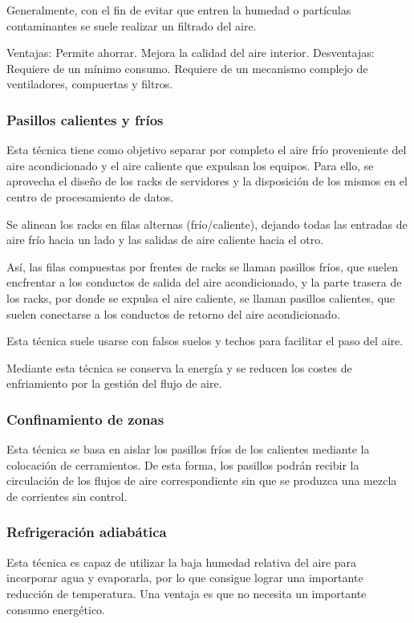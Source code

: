 Generalmente, con el fin de evitar que entren la humedad o partículas contaminantes se suele realizar un filtrado del aire.

Ventajas:
Permite ahorrar.
Mejora la calidad del aire interior.
Desventajas:
Requiere de un mínimo consumo.
Requiere de un mecanismo complejo de ventiladores, compuertas y filtros.

\subsubsection*{Pasillos calientes y fríos}

Esta técnica tiene como objetivo separar por completo el aire frío proveniente del aire acondicionado y el aire caliente que expulsan los equipos. Para ello, se aprovecha el diseño de los racks de servidores y la disposición de los mismos en el centro de procesamiento de datos.

Se alinean los racks en filas alternas (frío/caliente), dejando todas las entradas de aire frío hacia un lado y las salidas de aire caliente hacia el otro.

Así, las filas compuestas por frentes de racks se llaman pasillos fríos, que suelen encfrentar a los conductos de salida del aire acondicionado, y la parte trasera de los racks, por donde se expulsa el aire caliente, se llaman pasillos calientes, que suelen conectarse a los conductos de retorno del aire acondicionado.

Esta técnica suele usarse con falsos suelos y techos para facilitar el paso del aire.

Mediante esta técnica se conserva la energía y se reducen los costes de enfriamiento por la gestión del flujo de aire.


\subsubsection*{Confinamiento de zonas}

Esta técnica se basa en aislar los pasillos fríos de los calientes mediante la colocación de cerramientos. De esta forma, los pasillos podrán recibir la circulación de los flujos de aire correspondiente sin que se produzca una mezcla de corrientes sin control.

\subsubsection*{Refrigeración adiabática}

Esta técnica es capaz de utilizar la baja humedad relativa del aire para incorporar agua y evaporarla, por lo que consigue lograr una importante reducción de temperatura. Una ventaja es que no necesita un importante consumo energético.

